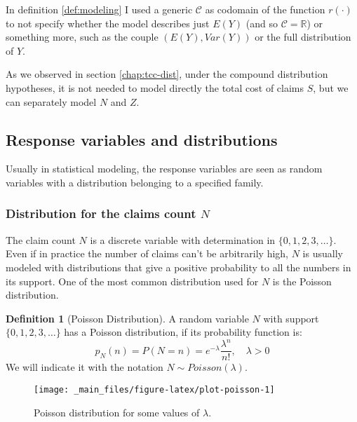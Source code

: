 \documentclass[a4paper, nobind]{templates/ociamthesis}
\theoremstyle{definition}
\newtheorem{definition}{Definition}[chapter]
\theoremstyle{definition}
\theoremstyle{definition}
\theoremstyle{remark}
\begin{document}
In definition \ref{def:modeling} I used a generic \(\mathcal{C}\) as codomain of the function \(r(\cdot)\) to not specify whether the model describes just \(E(Y)\) (and so \(\mathcal{C}=\mathbb{R}\)) or something more, such as the couple \(\left( E(Y), Var(Y) \right)\) or the full distribution of \(Y\).

As we observed in section \ref{chap:tcc-dist}, under the compound distribution hypotheses, it is not needed to model directly the total cost of claims \(S\), but we can separately model \(N\) and \(Z\).

\hypertarget{response-variables-and-distributions}{%
\subsection{Response variables and distributions}\label{response-variables-and-distributions}}

Usually in statistical modeling, the response variables are seen as random variables with a distribution belonging to a specified family.

\hypertarget{chap:dist-n}{%
\subsubsection{\texorpdfstring{Distribution for the claims count \(N\)}{Distribution for the claims count N}}\label{chap:dist-n}}

The claim count \(N\) is a discrete variable with determination in \(\{0, 1, 2, 3,\dots\}\). Even if in practice the number of claims can't be arbitrarily high, \(N\) is usually modeled with distributions that give a positive probability to all the numbers in its support. One of the most common distribution used for \(N\) is the Poisson distribution.

\begin{definition}[Poisson Distribution]
\label{def:def-poisson} \iffalse (Poisson Distribution) \fi{} A random variable \(N\) with support \(\{0,1,2,3,\dots \}\) has a Poisson distribution, if its probability function is:
\[
p_N(n) = P\left( N = n \right) = e^{-\lambda}\frac{\lambda^n}{n!}, \quad \lambda>0
\]
We will indicate it with the notation \(N \sim Poisson(\lambda)\).
\end{definition}

\begin{figure}[hbtp]

{\centering \texttt{[image: \_main\_files/figure-latex/plot-poisson-1]} 

}

\caption{Poisson distribution for some values of $\lambda$.}\label{fig:plot-poisson}
\end{figure}
\end{document}
